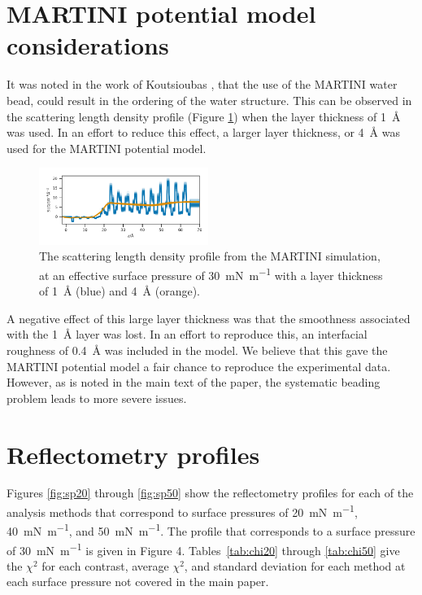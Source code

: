 \documentclass[amsmath,amssymb,superscriptaddress]{revtex4-1}
\begin{document}
\section{MARTINI potential model considerations}
It was noted in the work of Koutsioubas \cite{koutsioubas_combined_2016}, that the use of the MARTINI water bead, could result in the ordering of the water structure.
This can be observed in the scattering length density profile (Figure \ref{fig:mart}) when the layer thickness of \SI{1}{\angstrom} was used.
In an effort to reduce this effect, a larger layer thickness, or \SI{4}{\angstrom} was used for the MARTINI potential model.
%
\begin{figure}
 \centering
 \includegraphics[width=0.49\textwidth]{martini_order}
 \caption{The scattering length density profile from the MARTINI simulation, at an effective surface pressure of \SI{30}{\milli\newton\per\meter} with a layer thickness of \SI{1}{\angstrom} (blue) and \SI{4}{\angstrom} (orange). }
 \label{fig:mart}
\end{figure}
%

A negative effect of this large layer thickness was that the smoothness associated with the \SI{1}{\angstrom} layer was lost.
In an effort to reproduce this, an interfacial roughness of \SI{0.4}{\angstrom} was included in the model.
We believe that this gave the MARTINI potential model a fair chance to reproduce the experimental data.
However, as is noted in the main text of the paper, the systematic beading problem leads to more severe issues.

\section{Reflectometry profiles}
Figures \ref{fig:sp20} through \ref{fig:sp50} show the reflectometry profiles for each of the analysis methods that correspond to surface pressures of \SI{20}{\milli\newton\per\meter}, \SI{40}{\milli\newton\per\meter}, and \SI{50}{\milli\newton\per\meter}.
The profile that corresponds to a surface pressure of \SI{30}{\milli\newton\per\meter} is given in Figure 4.
Tables~\ref{tab:chi20} through \ref{tab:chi50} give the $\chi^2$ for each contrast, average $\chi^2$, and standard deviation for each method at each surface pressure not covered in the main paper.
\end{document}
